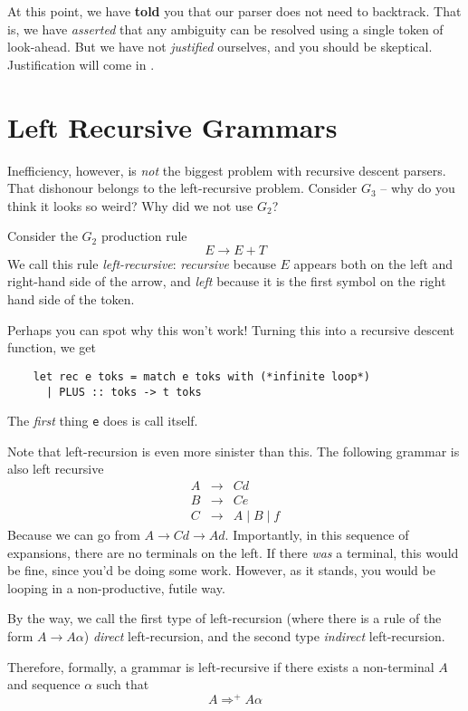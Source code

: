 At this point, we have \textbf{told} you that our parser does not need to backtrack. That is, we have \textit{asserted} that any ambiguity can be resolved using a single token of look-ahead. But we have not \textit{justified} ourselves, and you should be skeptical. Justification will come in .

\section{Left Recursive Grammars}
Inefficiency, however, is \textit{not} the biggest problem with recursive descent parsers. That dishonour belongs to the left-recursive problem. Consider $G_3$ -- why do you think it looks so weird? Why did we not use $G_2$?

Consider the $G_2$ production rule
\[ E \rightarrow E + T \]
We call this rule \textit{left-recursive}: \textit{recursive} because $E$ appears both on the left and right-hand side of the arrow, and \textit{left} because it is the first symbol on the right hand side of the token.

Perhaps you can spot why this won't work! Turning this into a recursive descent function, we get 
\begin{verbatim}
    let rec e toks = match e toks with (*infinite loop*)
      | PLUS :: toks -> t toks
\end{verbatim}

The \textit{first} thing \texttt{e} does is call itself. 

Note that left-recursion is even more sinister than this. The following grammar is also left recursive
\[\begin{array}{lcl}
     A & \rightarrow & Cd  \\
     B & \rightarrow & Ce \\
     C & \rightarrow & A \mid B \mid f
\end{array}\]
Because we can go from $A \rightarrow Cd \rightarrow Ad$. Importantly, in this sequence of expansions, there are no terminals on the left. If there \textit{was} a terminal, this would be fine, since you'd be doing some work. However, as it stands, you would be looping in a non-productive, futile way.

By the way, we call the first type of left-recursion (where there is a rule of the form $A \rightarrow A\alpha$) \textit{direct} left-recursion, and the second type \textit{indirect} left-recursion.

Therefore, formally, a grammar is left-recursive if there exists a non-terminal $A$ and sequence $\alpha$ such that
\[ A \Rightarrow^{+} A\alpha \]
